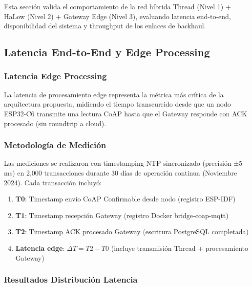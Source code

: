 Esta sección valida el comportamiento de la red híbrida Thread (Nivel 1) + HaLow (Nivel 2) + Gateway Edge (Nivel 3), evaluando latencia end-to-end, disponibilidad del sistema y throughput de los enlaces de backhaul.

\subsection{Latencia End-to-End y Edge Processing}
\label{sec:res-latencia}

\subsubsection{Latencia Edge Processing}
\label{sec:res-latencia-edge}

La latencia de procesamiento edge representa la métrica más crítica de la arquitectura propuesta, midiendo el tiempo transcurrido desde que un nodo ESP32-C6 transmite una lectura CoAP hasta que el Gateway responde con ACK procesado (sin roundtrip a cloud).

\subsubsection{Metodología de Medición}

Las mediciones se realizaron con timestamping NTP sincronizado (precisión ±5 ms) en 2,000 transacciones durante 30 días de operación continua (Noviembre 2024). Cada transacción incluyó:

\begin{enumerate}
    \item \textbf{T0}: Timestamp envío CoAP Confirmable desde nodo (registro ESP-IDF)
    \item \textbf{T1}: Timestamp recepción Gateway (registro Docker bridge-coap-mqtt)
    \item \textbf{T2}: Timestamp ACK procesado Gateway (escritura PostgreSQL completada)
    \item \textbf{Latencia edge}: $\Delta T = T2 - T0$ (incluye transmisión Thread + procesamiento Gateway)
\end{enumerate}

\subsubsection{Resultados Distribución Latencia}

